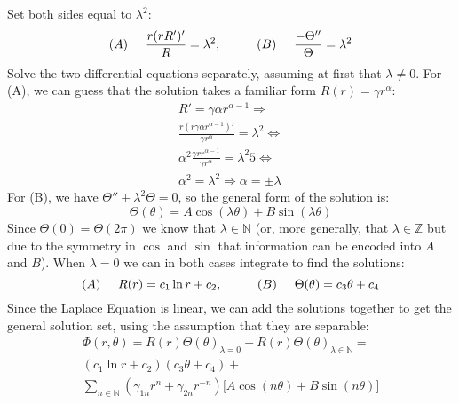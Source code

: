 \documentclass{article}
\begin{document}
Set both sides equal to $\lambda^2$:
\[ (A) \hspace{0.5cm} \frac{r(rR')'}{R} = \lambda^2, \hspace{1cm} (B) \hspace{0.5cm} \frac{- \Theta''}{\Theta} = \lambda^2 \]
Solve the two differential equations separately, assuming at first that $\lambda \neq 0$. For (A), we can guess that the solution takes a familiar form $R(r) = \gamma r^\alpha$:
\begin{gather*}
 R' = \gamma \alpha r^{\alpha - 1} \Rightarrow \\
 \frac{r(r\gamma \alpha r^{\alpha - 1})'}{\gamma r^\alpha} = \lambda^2 \Leftrightarrow \\
 \alpha^2 \frac{\gamma r r^{\alpha - 1}}{\gamma r^\alpha} = \lambda^2 5\Leftrightarrow \\
 \alpha^2 = \lambda^2 \Rightarrow \alpha = \pm \lambda 
\end{gather*}
For (B), we have $\Theta'' + \lambda^2 \Theta = 0$, so the general form of the solution is:
\[ \Theta(\theta) = A \cos(\lambda \theta) + B \sin(\lambda \theta) \]
Since $\Theta(0) = \Theta(2\pi)$ we know that $\lambda \in \mathbb{N}$ (or, more generally,
that $\lambda \in \mathbb{Z}$ but due to the symmetry in $\cos$ and $\sin$ that information can be encoded into $A$ and $B$).
When $\lambda = 0$ we can in both cases integrate to find the solutions:
\[ (A) \hspace{0.5cm} R(r) = c_1 \ln r + c_2,\hspace{1cm} (B)\hspace{0.5cm} \Theta(\theta) = c_3 \theta + c_4 \]
Since the Laplace Equation is linear, we can add the solutions together to get the general solution set, using the assumption that they are separable:
\begin{gather}
 \Phi(r, \theta) = R(r)\Theta(\theta)_{\lambda = 0} + R(r)\Theta(\theta)_{\lambda \in \mathbb{N}} = \nonumber \\
 (c_1 \ln r + c_2)(c_3 \theta + c_4) + \nonumber \\ 
\sum_{n \in \mathbb{N}} (\gamma_{1n} r^n + \gamma_{2n} r^{-n})
\big[A \cos(n \theta) + B \sin(n \theta) \big] \label{generalsol}
\end{gather}
\end{document}
